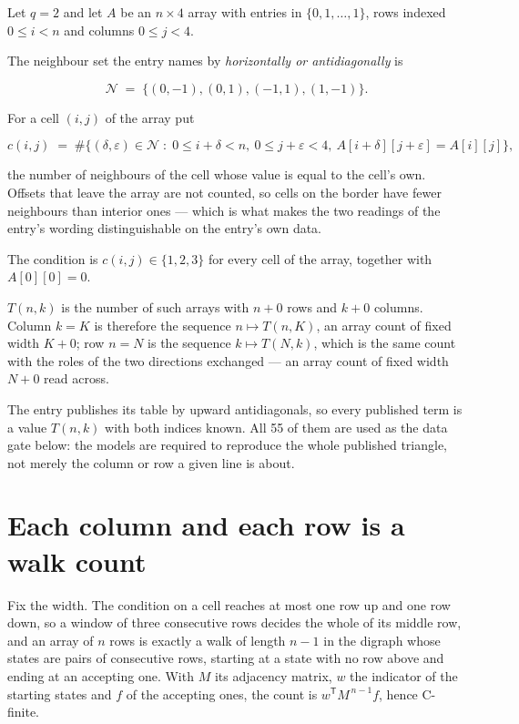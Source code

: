 \documentclass[11pt]{article}
\theoremstyle{definition}
\begin{document}
Let $q = 2$ and let $A$ be an $n \times 4$ array with entries in $\{0,1,\dots,1\}$, rows indexed $0 \le i < n$ and columns $0 \le j < 4$.

The neighbour set the entry names by {\itshape horizontally or antidiagonally} is

\[\mathcal{N} \;=\; \{(0,-1), (0,1), (-1,1), (1,-1)\}.\]

For a cell $(i,j)$ of the array put

\[c(i,j) \;=\; \#\bigl\{(\delta,\varepsilon)\in\mathcal{N} \;:\; 0\le i+\delta<n,\ 0\le j+\varepsilon<4,\ A[i+\delta][j+\varepsilon] = A[i][j]\bigr\},\]

the number of neighbours of the cell whose value is equal to the cell's own. Offsets that leave the array are not counted, so cells on the border have fewer neighbours than interior ones --- which is what makes the two readings of the entry's wording distinguishable on the entry's own data.

The condition is $c(i,j) \in \{1, 2, 3\}$ for every cell of the array, together with $A[0][0]=0$.

$T(n,k)$ is the number of such arrays with $n + 0$ rows and $k + 0$ columns. Column $k = K$ is therefore the sequence $n \mapsto T(n,K)$, an array count of fixed width $K + 0$; row $n = N$ is the sequence $k \mapsto T(N,k)$, which is the same count with the roles of the two directions exchanged --- an array count of fixed width $N + 0$ read across.

The entry publishes its table by upward antidiagonals, so every published term is a value $T(n,k)$ with both indices known. All 55 of them are used as the data gate below: the models are required to reproduce the whole published triangle, not merely the column or row a given line is about.

\section{Each column and each row is a walk count}

Fix the width. The condition on a cell reaches at most one row up and one row down, so a window of three consecutive rows decides the whole of its middle row, and an array of $n$ rows is exactly a walk of length $n-1$ in the digraph whose states are pairs of consecutive rows, starting at a state with no row above and ending at an accepting one. With $M$ its adjacency matrix, $w$ the indicator of the starting states and $f$ of the accepting ones, the count is $w^{\mathsf T}M^{\,n-1}f$, hence C-finite.
\end{document}
